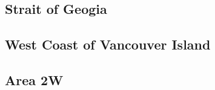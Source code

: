 \subsection{Strait of Geogia}
\begin{multicols}{2}

\tiny
\begin{alltt}
 
\end{alltt}
\normalsize

\tiny
\begin{alltt}
 
\end{alltt}
\normalsize

\end{multicols}

\subsection{West Coast of Vancouver Island}
\begin{multicols}{2}

\tiny
\begin{alltt}
 
\end{alltt}
\normalsize

\tiny
\begin{alltt}
 
\end{alltt}
\normalsize

\end{multicols}

\subsection{Area 2W}
\begin{multicols}{2}

\tiny
\begin{alltt}
 
\end{alltt}
\normalsize

\tiny
\begin{alltt}
 
\end{alltt}
\normalsize

\end{multicols}


